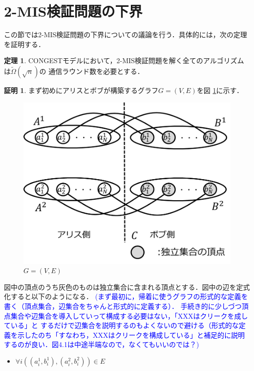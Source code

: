 \documentclass[12pt]{thesis}
\newcommand{\Izumi}[1]{\textcolor{blue}{(#1)}}
\newcommand{\CONGEST}{\textsf{CONGEST}}
\theoremstyle{definition}
\newtheorem{theorem}{定理}[chapter]
\newtheorem*{prf*}{証明}
\begin{document}
\section{2-MIS検証問題の下界}

この節では2-MIS検証問題の下界についての議論を行う．具体的には，次の定理を証明する．
\begin{theorem}
{\CONGEST}モデルにおいて，2-MIS検証問題を解く全てのアルゴリズムは$\tilde{\Omega} (\sqrt{n})$の
通信ラウンド数を必要とする．
\end{theorem}
\begin{prf*}
まず初めにアリスとボブが構築するグラフ$G = (V, E)$を図 \ref{2_G}に示す． 

\begin{figure}[ht]
\begin{center}
\includegraphics[width=120mm]{2_G.png}
\end{center}
\caption{$G = (V, E)$}
\label{2_G}
\end{figure}

図中の頂点のうち灰色のものは独立集合に含まれる頂点とする．図中の辺を定式化すると以下のようになる．
\Izumi{まず最初に，帰着に使うグラフの形式的な定義を書く（頂点集合，辺集合をちゃんと形式的に定義する）．
手続き的に少しづつ頂点集合や辺集合を導入していって構成する必要はない，「XXXはクリークを成している」と
するだけで辺集合を説明するのもよくないので避ける（形式的な定義を示したのち「すなわち，XXXはクリークを構成している」と補足的に説明するのが良い．図4.1は中途半端なので，なくてもいいのでは？}
\begin{itemize}
\item $\forall i((a_{i}^{1}, b_{i}^{1}), (a_{i}^{2}, b_{i}^{2})) \in E$
\end{itemize}



\end{prf*}
\end{document}
